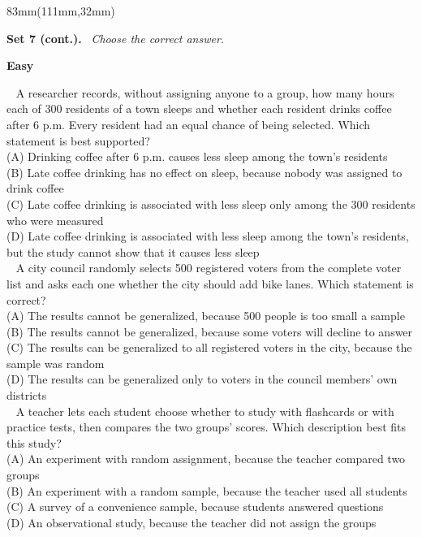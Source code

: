 \documentclass[a4paper]{article}
\newcommand{\RCOL}{111mm}
\newcommand{\COLW}{83mm}
\newcommand{\setkicker}[2]{%
{\sffamily\bfseries\fontsize{12}{14}\selectfont #1.}\ {\itshape\fontsize{11}{14}\selectfont\color{black!75} #2}\par\vspace{2mm}%
}
\newcommand{\pnum}[1]{\fcolorbox{ink}{white}{\sffamily\bfseries\fontsize{8}{8}\selectfont #1}~}
\newcommand{\satqw}[6]{%
\noindent\pnum{#1} #2\\[2mm]
\hspace*{7mm}(A) #3\\[1.6mm]
\hspace*{7mm}(B) #4\\[1.6mm]
\hspace*{7mm}(C) #5\\[1.6mm]
\hspace*{7mm}(D) #6\\[7mm]%
}
\begin{document}
\begin{textblock*}{\COLW}(\RCOL,32mm)
{\fontsize{10.3}{13}\selectfont
\setkicker{Set 7 (cont.)}{Choose the correct answer.}
{\sffamily\bfseries\color{accent}\fontsize{10.5}{12}\selectfont Easy}\par\vspace{1.5mm}
\satqw{5}{A researcher records, without assigning anyone to a group, how many hours each of 300 residents of a town sleeps and whether each resident drinks coffee after 6 p.m. Every resident had an equal chance of being selected. Which statement is best supported?}{Drinking coffee after 6 p.m. causes less sleep among the town's residents}{Late coffee drinking has no effect on sleep, because nobody was assigned to drink coffee}{Late coffee drinking is associated with less sleep only among the 300 residents who were measured}{Late coffee drinking is associated with less sleep among the town's residents, but the study cannot show that it causes less sleep}
\satqw{6}{A city council randomly selects 500 registered voters from the complete voter list and asks each one whether the city should add bike lanes. Which statement is correct?}{The results cannot be generalized, because 500 people is too small a sample}{The results cannot be generalized, because some voters will decline to answer}{The results can be generalized to all registered voters in the city, because the sample was random}{The results can be generalized only to voters in the council members' own districts}
\satqw{7}{A teacher lets each student choose whether to study with flashcards or with practice tests, then compares the two groups' scores. Which description best fits this study?}{An experiment with random assignment, because the teacher compared two groups}{An experiment with a random sample, because the teacher used all students}{A survey of a convenience sample, because students answered questions}{An observational study, because the teacher did not assign the groups}
}
\end{textblock*}
\clearpage
\end{document}
